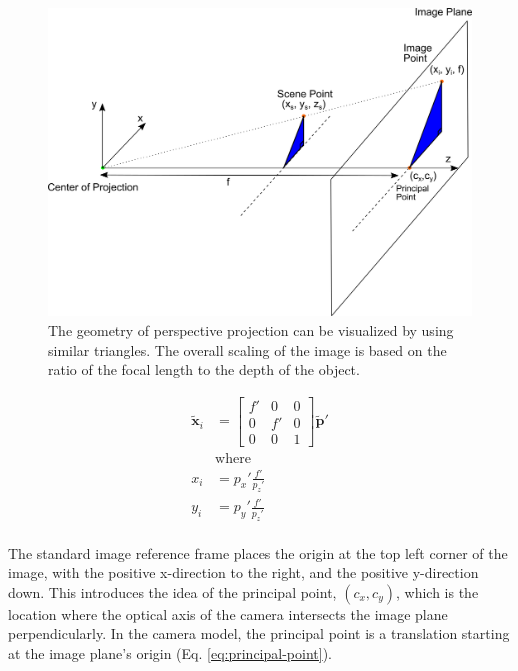 \begin{figure}[h!]
    \begin{center}
        \includegraphics[width=0.85\linewidth]{figs/background/png/perspective-projection.png}
    \end{center}
    \caption{The geometry of perspective projection can be visualized by using similar triangles. The overall scaling of the image is based on the ratio of the focal length to the depth of the object.                                                 }
    \label{fig:perspective-projection}
\end{figure}


\begin{equation}
    \begin{aligned}
        \tilde{\mathbf{x}}_{i} &= \begin{bmatrix}
            f' & 0 & 0 \\ 0 & f' & 0 \\ 0 & 0 & 1 
        \end{bmatrix} \tilde{\mathbf{p}}' \\
        &\text{where} \\
        x_i &= p_x'\frac{f'}{p_z'} \\
        y_i &= p_y'\frac{f'}{p_z'} \\
    \end{aligned}
    \label{eq:perspective-projection}
\end{equation}

The standard image reference frame places the origin at the top left corner of the image, with the positive x-direction to the right, and the positive y-direction down.
This introduces the idea of the principal point, $(c_x,c_y)$, which is the location where the optical axis of the camera intersects the image plane perpendicularly.
In the camera model, the principal point is a translation starting at the image plane's origin (Eq. \ref{eq:principal-point}).


